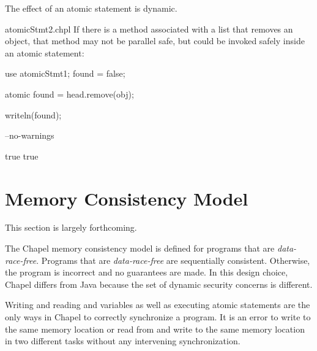 The effect of an atomic statement is dynamic.

\begin{chapelexample}{atomicStmt2.chpl}
If there is a method associated with a list that removes an object,
that method may not be parallel safe, but could be invoked safely inside an
atomic statement:
\begin{chapelpre}
use atomicStmt1;
found = false;
\end{chapelpre}
\begin{chapel}
atomic found = head.remove(obj);
\end{chapel}
\begin{chapelpost}
writeln(found);
\end{chapelpost}
\begin{chapelcompopts}
--no-warnings
\end{chapelcompopts}
\begin{chapeloutput}
true
true
\end{chapeloutput}
\end{chapelexample}

\section{Memory Consistency Model}
\label{Memory_Consistency}

\begin{openissue}
This section is largely forthcoming.
\end{openissue}

The Chapel memory consistency model is defined for programs that are
{\em data-race-free}.  Programs that are {\em data-race-free} are
sequentially consistent.  Otherwise, the program is incorrect and no
guarantees are made.  In this design choice, Chapel differs from Java
because the set of dynamic security concerns is different.

Writing and reading  and  variables as well as
executing atomic statements are the only ways in Chapel to correctly
synchronize a program.  It is an error to write to the same memory
location or read from and write to the same memory location in two
different tasks without any intervening synchronization.

